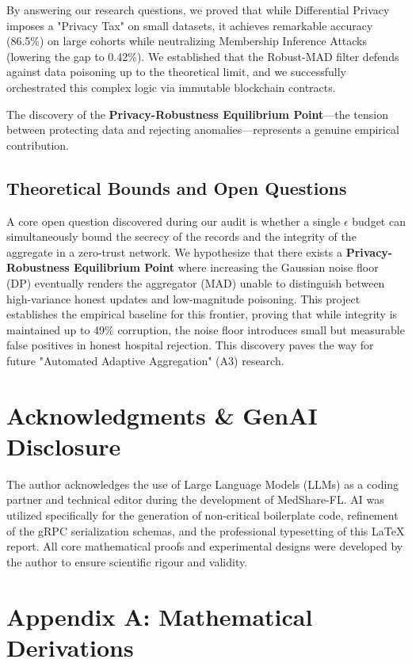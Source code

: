 \documentclass[10pt, a4paper, twocolumn]{article}
\begin{document}
By answering our research questions, we proved that while Differential Privacy imposes a "Privacy Tax" on small datasets, it achieves remarkable accuracy (86.5\%) on large cohorts while neutralizing Membership Inference Attacks (lowering the gap to 0.42\%). We established that the Robust-MAD filter defends against data poisoning up to the theoretical limit, and we successfully orchestrated this complex logic via immutable blockchain contracts.

The discovery of the \textbf{Privacy-Robustness Equilibrium Point}—the tension between protecting data and rejecting anomalies—represents a genuine empirical contribution.

\subsection{Theoretical Bounds and Open Questions}
A core open question discovered during our audit is whether a single $\epsilon$ budget can simultaneously bound the secrecy of the records and the integrity of the aggregate in a zero-trust network. We hypothesize that there exists a \textbf{Privacy-Robustness Equilibrium Point} where increasing the Gaussian noise floor (DP) eventually renders the aggregator (MAD) unable to distinguish between high-variance honest updates and low-magnitude poisoning. This project establishes the empirical baseline for this frontier, proving that while integrity is maintained up to 49\% corruption, the noise floor introduces small but measurable false positives in honest hospital rejection. This discovery paves the way for future "Automated Adaptive Aggregation" (A3) research.


\section*{Acknowledgments \& GenAI Disclosure}
The author acknowledges the use of Large Language Models (LLMs) as a coding partner and technical editor during the development of MedShare-FL. AI was utilized specifically for the generation of non-critical boilerplate code, refinement of the gRPC serialization schemas, and the professional typesetting of this LaTeX report. All core mathematical proofs and experimental designs were developed by the author to ensure scientific rigour and validity.

\section*{Appendix A: Mathematical Derivations}
\end{document}
